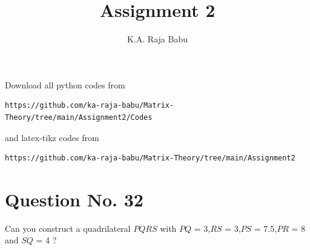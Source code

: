 \documentclass[journal,12pt,twocolumn]{IEEEtran}
\begin{document}
     \def\rightbox#1{\makebox[0in][r]{#1}}
     \def\centbox#1{\makebox[0in]{#1}}
     \def\topbox#1{\raisebox{-\baselineskip}[0in][0in]{#1}}
     \def\midbox#1{\raisebox{-0.5\baselineskip}[0in][0in]{#1}}
\vspace{3cm}
\title{Assignment 2}
\author{K.A. Raja Babu}
\maketitle
\newpage
\bigskip
\renewcommand{\thefigure}{\theenumi}
\renewcommand{\thetable}{\theenumi}
Download all python codes from 
\begin{lstlisting}
https://github.com/ka-raja-babu/Matrix-Theory/tree/main/Assignment2/Codes
\end{lstlisting}
%
and latex-tikz codes from 
%
\begin{lstlisting}
https://github.com/ka-raja-babu/Matrix-Theory/tree/main/Assignment2
\end{lstlisting}
%
\section{Question No. 32}
Can you construct a quadrilateral $PQRS$ with $PQ$ = 3,$RS$ = 3,$PS$ = 7.5,$PR$ = 8 and $SQ$ = 4 ?
%
\end{document}
